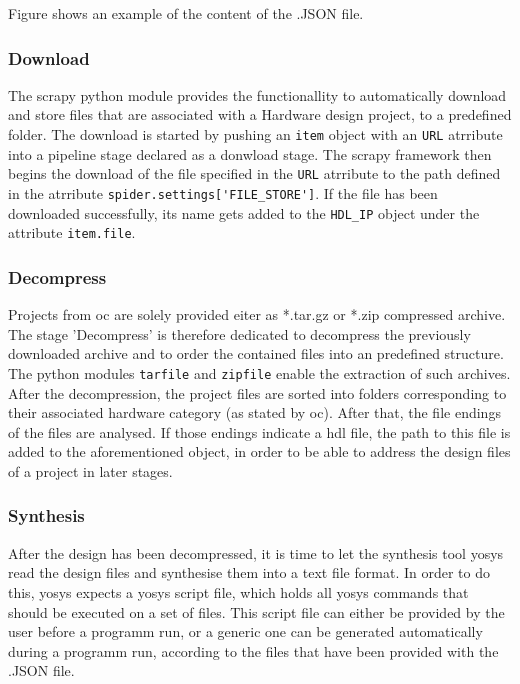 Figure  shows an example of the content of the .JSON file. 

\subsubsection{Download}
The \Gls{scrapy} \Gls{python} module provides the functionallity to automatically download and
store files that are associated with a Hardware design project, to a predefined
folder. The download is started by pushing an \lstinline{item} object with an \lstinline{URL} atrribute into a pipeline stage declared as a donwload stage. The \Gls{scrapy} framework then begins the download of the file specified in the \lstinline{URL} atrribute to the path defined in the atrribute \lstinline{spider.settings['FILE_STORE']}. If the file has been downloaded successfully, its name gets added to the \lstinline{HDL_IP} object under the attribute \lstinline{item.file}.  

\subsubsection{Decompress} 
Projects from \gls{oc} are solely provided eiter as *.tar.gz or *.zip compressed archive. The stage 'Decompress' is therefore dedicated to decompress the previously downloaded archive and to order the contained files into an predefined structure. The \Gls{python} modules \lstinline{tarfile} and \lstinline{zipfile} enable the extraction of such archives.
After the decompression, the project files are sorted into folders corresponding to 
their associated hardware category (as stated by \gls{oc}). After that, the file 
endings of the files are analysed. If those endings indicate a \gls{hdl} file, the path 
to this file is added to the aforementioned  object, in order to be able to
address the design files of a project in later stages.

\subsubsection{Synthesis} 
After the design has been decompressed, it is time to let the synthesis tool 
yosys read the design files and synthesise them into a text file format. In 
order to do this, yosys expects a yosys script file, which holds all yosys commands 
that should be executed on a set of files. This script file can either be provided
by the user before a programm run, or a generic one can be generated automatically 
during a programm run, according to the files that have been provided with the 
.JSON file. 


